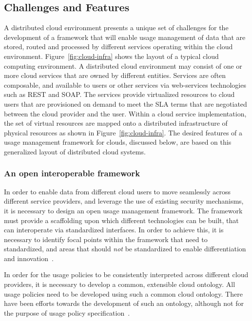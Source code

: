 \documentclass[notitlepage]{book}
\begin{document}
\begin{doublespace}
\subsection{Challenges and Features}
A distributed cloud environment presents a unique set of challenges for the development of a framework that will enable usage management of data that are stored, routed and processed by different services operating within the cloud environment. Figure~\ref{fig:cloud-infra} shows the layout of a typical cloud computing environment. A distributed cloud environment may consist of one or more cloud services that are owned by different entities. Services are often composable, and available to users or other services via web-services technologies such as REST and SOAP.  The services provide virtualized resources to cloud users that are provisioned on demand to meet the SLA terms that are negotiated between the cloud provider and the user. Within a cloud service implementation, the set of virtual resources are mapped onto a distributed infrastructure of physical resources as shown in Figure~\ref{fig:cloud-infra}. The desired features of a usage management framework for clouds, discussed below, are based on this generalized layout of distributed cloud systems.

\subsubsection {An open interoperable framework}

In order to enable data from different cloud users to move seamlessly across different service providers, and leverage the use of existing security mechanisms, it is necessary to design an open usage management framework. The framework must provide a scaffolding upon which different technologies can be built, that can interoperate via standardized interfaces. In order to achieve this, it is necessary to identify focal points within the framework that need to standardized, and areas that should {\em not} be standardized to enable differentiation and innovation~\cite{BlCl:01}. 

In order for the usage policies to be consistently interpreted across different cloud providers, it is necessary to develop a common, extensible cloud ontology. All usage policies need to be developed using such a common cloud ontology.  There have been efforts towards the development of such an ontology, although not for the purpose of usage policy specification~\cite{YuBuDa:08}. 


\end{doublespace}
\end{document}
